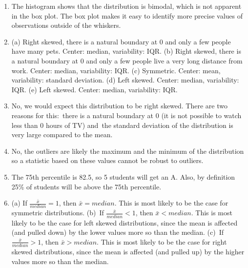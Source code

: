 \documentclass[
  10pt,
  openany]{book}
\begin{document}
\begin{enumerate}
  \addtocounter{enumi}{1}
\item
  The histogram shows that the distribution is bimodal, which is not apparent in the box plot. The box plot makes it easy to identify more precise values of observations outside of the whiskers.

  \addtocounter{enumi}{1}
\item
  (a) Right skewed, there is a natural boundary at 0 and only a few people have many pets. Center: median, variability: IQR. (b) Right skewed, there is a natural boundary at 0 and only a few people live a very long distance from work. Center: median, variability: IQR. (c) Symmetric. Center: mean, variability: standard deviation. (d) Left skewed. Center: median, variability: IQR. (e) Left skewed. Center: median, variability: IQR.

  \addtocounter{enumi}{1}
\item
  No, we would expect this distribution to be right skewed. There are two reasons for this:~there is a natural boundary at 0 (it is not possible to watch less than 0 hours of TV) and~the standard deviation of the distribution is very large compared to the mean.

  \addtocounter{enumi}{1}
\item
  No, the outliers are likely the maximum and the minimum of the distribution so a statistic based on these values cannot be robust to outliers.

  \addtocounter{enumi}{1}
\item
  The 75th percentile is 82.5, so 5 students will get an A. Also, by definition 25\% of students will be above the 75th percentile.

  \addtocounter{enumi}{1}
\item
  (a) If \(\frac{\bar{x}}{median} = 1\), then \(\bar{x} = median\). This is most likely to be the case for symmetric distributions. (b)~If \(\frac{\bar{x}}{median} < 1\), then \(\bar{x} < median\). This is most likely to be the case for left skewed distributions, since the mean is affected (and pulled down) by the lower values more so than the median. (c)~If \(\frac{\bar{x}}{median} > 1\), then \(\bar{x} > median\). This is most likely to be the case for right skewed distributions, since the mean is affected (and pulled up) by the higher values more so than the median.


\end{enumerate}
\end{document}
